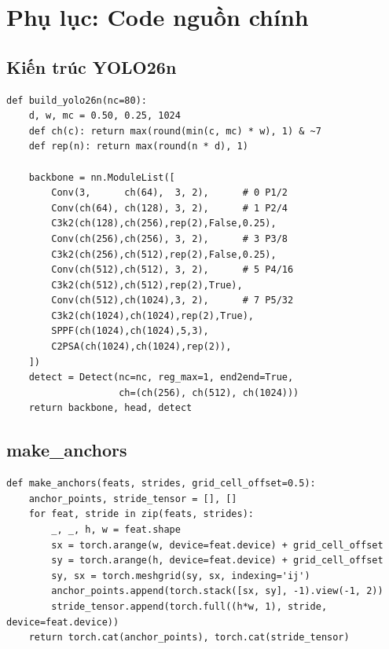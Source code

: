 \chapter{Phụ lục: Code nguồn chính}
\label{ch:appendix}

\section{Kiến trúc YOLO26n}

\begin{lstlisting}[caption={build\_yolo26n --- Xây dựng model YOLO26 scale nano}]
def build_yolo26n(nc=80):
    d, w, mc = 0.50, 0.25, 1024
    def ch(c): return max(round(min(c, mc) * w), 1) & ~7
    def rep(n): return max(round(n * d), 1)

    backbone = nn.ModuleList([
        Conv(3,      ch(64),  3, 2),      # 0 P1/2
        Conv(ch(64), ch(128), 3, 2),      # 1 P2/4
        C3k2(ch(128),ch(256),rep(2),False,0.25),
        Conv(ch(256),ch(256), 3, 2),      # 3 P3/8
        C3k2(ch(256),ch(512),rep(2),False,0.25),
        Conv(ch(512),ch(512), 3, 2),      # 5 P4/16
        C3k2(ch(512),ch(512),rep(2),True),
        Conv(ch(512),ch(1024),3, 2),      # 7 P5/32
        C3k2(ch(1024),ch(1024),rep(2),True),
        SPPF(ch(1024),ch(1024),5,3),
        C2PSA(ch(1024),ch(1024),rep(2)),
    ])
    detect = Detect(nc=nc, reg_max=1, end2end=True,
                    ch=(ch(256), ch(512), ch(1024)))
    return backbone, head, detect
\end{lstlisting}

\section{make\_anchors}

\begin{lstlisting}[caption={make\_anchors --- Tạo anchor points cho detection}]
def make_anchors(feats, strides, grid_cell_offset=0.5):
    anchor_points, stride_tensor = [], []
    for feat, stride in zip(feats, strides):
        _, _, h, w = feat.shape
        sx = torch.arange(w, device=feat.device) + grid_cell_offset
        sy = torch.arange(h, device=feat.device) + grid_cell_offset
        sy, sx = torch.meshgrid(sy, sx, indexing='ij')
        anchor_points.append(torch.stack([sx, sy], -1).view(-1, 2))
        stride_tensor.append(torch.full((h*w, 1), stride, device=feat.device))
    return torch.cat(anchor_points), torch.cat(stride_tensor)
\end{lstlisting}

